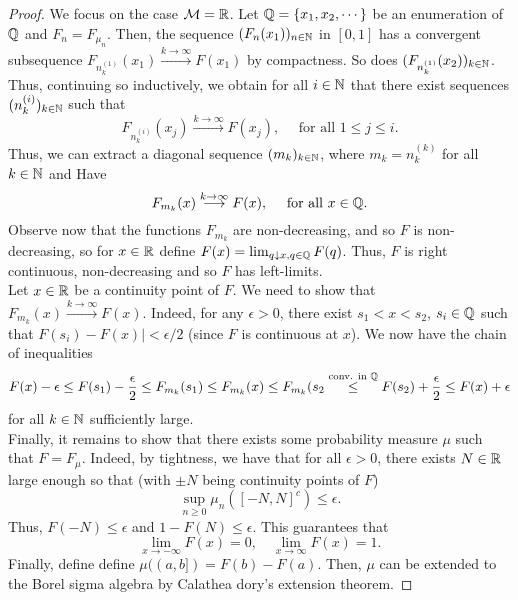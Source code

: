 \documentclass{article}
\begin{document}
\begin{proof}   

We focus on the case $ \mathcal{M} = \mathbb{R}$. Let $ \mathbb{Q} = \{x_{1}, x_{2}, \cdots\}$ be an enumeration of $ \mathbb{Q}$ and $ F_{n} = F_{\mu_{n}}$. Then, the sequence $ (F_{n}(x_{1}))_{n\in \mathbb{N}}$ in $ [0,1]$ has a convergent subsequence $F_{n^{(1)}_{k}}(x_{1})\stackrel{k\to \infty}{\longrightarrow} F(x_{1})$ by compactness. So does $ (F_{n^{(1)}_{k}}(x_{2}))_{k\in \mathbb{N}}$. Thus, continuing so inductively, we obtain for all $ i\in \mathbb{N}$ that there exist sequences $ (n^{(i)}_{k})_{k\in \mathbb{N}}$ such that 
\[
F_{n^{(i)}_{k}}(x_{j}) \stackrel{k\to \infty}{\longrightarrow}F(x_{j}), \quad \text{ for all } 1\leq j\leq i.
\]
Thus, we can extract a diagonal sequence $ (m_{k})_{k\in \mathbb{N}}$, where $ m_{k} = n^{(k)}_{k}$ for all $ k\in \mathbb{N}$ and Have 
\[
F_{m_{k}}(x) \stackrel{k\to \infty}{\longrightarrow} F(x), \quad \text{ for all } x\in \mathbb{Q}.
\]
Observe now that the functions $ F_{m_{k}}$ are non-decreasing, and so $ F$ is non-decreasing, so for $ x\in \mathbb{R}$ define $ F(x) = \lim_{q\downarrow x, q\in \mathbb{Q}} F(q)$. Thus, $ F$ is right continuous, non-decreasing and so $ F$ has left-limits.\\ 

Let $ x\in \mathbb{R}$ be a continuity point of $ F$. We need to show that $ F_{m_{k}}(x)\stackrel{k\to \infty}{\longrightarrow}F(x)$. Indeed, for any $ \epsilon >0$, there exist $ s_{1}<x<s_{2}$, $ s_{i}\in \mathbb{Q}$ such that  $F(s_{i})-F(x)|<\epsilon/2$ (since $ F$ is continuous at $ x$). We now have the chain of inequalities
\[
	F(x)-\epsilon\leq F(s_{1})-\frac{\epsilon}{2}\leq F_{m_{k}}(s_{1})\leq F_{m_{k}}(x)\leq F_{m_{k}}(s_{2}\stackrel{\text{conv. in } \mathbb{Q}}{\leq} F(s_{2})+\frac{\epsilon}{2}\leq F(x)+\epsilon
\]
for all $ k\in \mathbb{N}$ sufficiently large.\\ 

Finally, it remains to show that  there exists some probability measure $ \mu$ such that $ F = F_{\mu}$. Indeed, by tightness, we have that for all $ \epsilon>0$, there exists $ N\in \mathbb{R}$ large enough so that (with $ \pm N$ being continuity points of $ F$)
\[
	\displaystyle\sup_{n\geq 0 }\mu_{n}([-N, N]^{c})\leq \epsilon.
\]
Thus, $ F(-N)\leq \epsilon$ and $ 1-F(N)\leq \epsilon$. This guarantees that 
\[
\lim_{x\to -\infty} F(x) = 0, \quad \lim_{x \to \infty} F(x) = 1.
\]
Finally, define define $ \mu((a,b]) = F(b)-F(a)$. Then, $\mu$ can be extended to the Borel sigma algebra by Calathea dory's extension theorem.
\end{proof}
\end{document}
